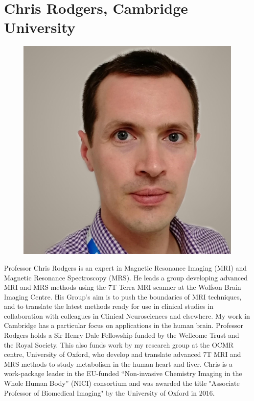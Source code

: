 \documentclass[a5paper,10pt,twoside,onecolumn,openany,helvetica,showtrims]{memoir}
\newlength{\SpeakerSize}
\begin{document}
\section*{Chris Rodgers, Cambridge University}
\begin{figure}
\includegraphics[width=\SpeakerSize]{SpeakerPics/image9}	
\end{figure}
Professor Chris Rodgers is an expert in Magnetic Resonance Imaging (MRI) and Magnetic Resonance Spectroscopy (MRS). He leads a group developing advanced MRI and MRS methods using the 7T Terra MRI scanner at the Wolfson Brain Imaging Centre. His Group’s aim is to push the boundaries of MRI techniques, and to translate the latest methods ready for use in clinical studies in collaboration with colleagues in Clinical Neurosciences and elsewhere. My work in Cambridge has a particular focus on applications in the human brain. Professor Rodgers holds a Sir Henry Dale Fellowship funded by the Wellcome Trust and the Royal Society. This also funds work by my research group at the OCMR centre, University of Oxford, who develop and translate advanced 7T MRI and MRS methods to study metabolism in the human heart and liver. Chris is a work-package leader in the EU-funded ``Non-invasive Chemistry Imaging in the Whole Human Body'' (NICI) consortium and was awarded the title "Associate Professor of Biomedical Imaging" by the University of Oxford in 2016.
\end{document}
